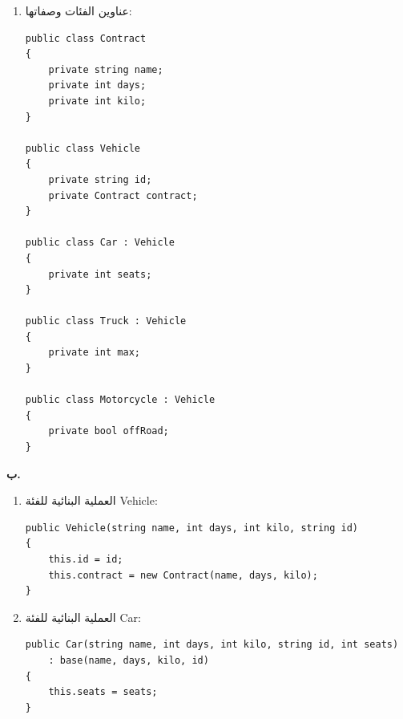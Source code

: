\begin{boxSolution}
\begin{enumerate}[label=\textbf{(\arabic*)}, start=2]
    \item عناوين الفئات وصفاتها:
\begin{boxCode}
\begin{english}
\begin{verbatim}
public class Contract
{
    private string name;
    private int days;
    private int kilo;
}

public class Vehicle
{
    private string id;
    private Contract contract;
}

public class Car : Vehicle
{
    private int seats;
}

public class Truck : Vehicle
{
    private int max;
}

public class Motorcycle : Vehicle
{
    private bool offRoad;
}
\end{verbatim}
\end{english}
\end{boxCode}
\end{enumerate}
\end{boxSolution}

\filbreak

\begin{boxSolution}
\textbf{ب.}
\begin{enumerate}[label=\textbf{(\arabic*)}, itemsep=0.6em]
    \item العملية البنائية للفئة \textenglish{Vehicle}:
\begin{boxCode}
\begin{english}
\begin{verbatim}
public Vehicle(string name, int days, int kilo, string id)
{
    this.id = id;
    this.contract = new Contract(name, days, kilo);
}
\end{verbatim}
\end{english}
\end{boxCode}

    \item العملية البنائية للفئة \textenglish{Car}:
\begin{boxCode}
\begin{english}
\begin{verbatim}
public Car(string name, int days, int kilo, string id, int seats)
    : base(name, days, kilo, id)
{
    this.seats = seats;
}
\end{verbatim}
\end{english}
\end{boxCode}
\end{enumerate}
\end{boxSolution}

